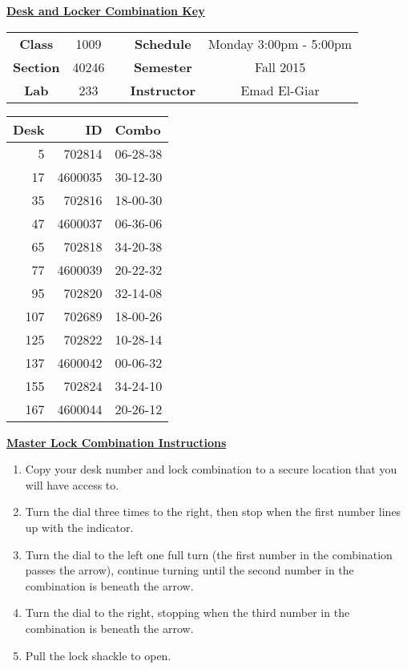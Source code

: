 \documentclass[12pt]{article}
\begin{document}
\thispagestyle{empty}

\begin{center}
	{\huge\textbf{\underline{ Desk and Locker Combination Key}}}
\end{center}


\begin{table}[h]
  \centering
  \begin{tabular}{ccccc}

  \textbf{Class} & 1009 & {\qquad} &\textbf{Schedule} & Monday 3:00pm - 5:00pm \\
  \textbf{Section} & 40246 & {\qquad} & \textbf{Semester} & Fall 2015 \\
  \textbf{Lab} & 233 & {\qquad} & \textbf{Instructor} & Emad El-Giar \\
  \end{tabular}
\end{table}
 \vspace{0.5in}
\begin{minipage}{0.4\textwidth}

\begin{tabular}{rrl}
\toprule
 Desk &       ID &     Combo \\
\midrule
    5 &   702814 &  06-28-38 \\
   17 &  4600035 &  30-12-30 \\
   35 &   702816 &  18-00-30 \\
   47 &  4600037 &  06-36-06 \\
   65 &   702818 &  34-20-38 \\
   77 &  4600039 &  20-22-32 \\
   95 &   702820 &  32-14-08 \\
  107 &   702689 &  18-00-26 \\
  125 &   702822 &  10-28-14 \\
  137 &  4600042 &  00-06-32 \\
  155 &   702824 &  34-24-10 \\
  167 &  4600044 &  20-26-12 \\
\bottomrule
\end{tabular}


\end{minipage}
\begin{minipage}{0.4\textwidth}
\underline{{\large \textbf{Master Lock Combination Instructions}}}
\begin{enumerate}
\item Copy your desk number and lock combination to a secure location that you will have access to.
\item Turn the dial three times to the right, then stop when the first number lines up with the indicator.
\item Turn the dial to the left one full turn (the first number in the combination passes the arrow), continue turning until the second number in the combination is beneath the arrow.
\item Turn the dial to the right, stopping when the third number in the combination is beneath the arrow.
\item Pull the lock shackle to open.
\end{enumerate}
\end{minipage}
\end{document}
